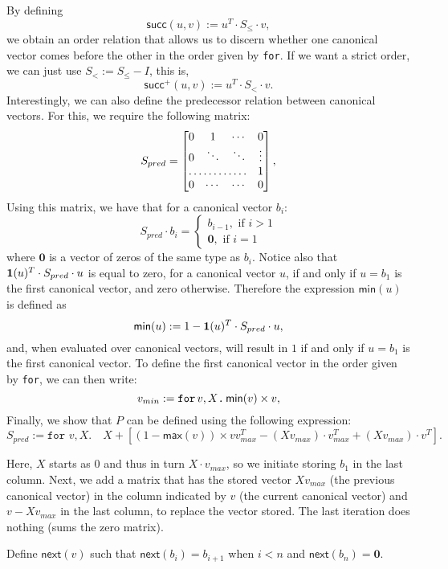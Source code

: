 By defining $$\mathsf{succ}(u,v) := u^T\cdot S_{\leq} \cdot v,$$
we obtain an order relation that allows us to discern whether one canonical vector comes before the other in the order given by \texttt{for}. If we want a strict order, we can just use $S_< := S_{\leq} - I$, this is, $$\mathsf{succ}^+(u,v) := u^T\cdot S_{<} \cdot v.$$
Interestingly, we can also define the predecessor relation between canonical vectors. For this, we require the following matrix:
\[
S_{pred} = \begin{bmatrix}
    0 & 1 & \cdots &  0 \\
    0 & \ddots & \ddots & \vdots \\
    \hdotsfor{3} & 1 \\
    0 & \cdots & \cdots & 0
\end{bmatrix},
\]
Using this matrix, we have that for a canonical vector $b_i$:
\[
S_{pred}\cdot b_i=\begin{cases}
               b_{i-1}, \text{ if } i > 1 \\
              \mathbf{0}, \text{ if } i = 1
            \end{cases}
\]
where $\mathbf{0}$ is a vector of zeros of the same type as $b_i$. Notice also that $\mathbf{1}(u)^T\cdot S_{pred} \cdot u$ is equal to zero, for a canonical vector $u$, if and only if $u = b_1$ is the first canonical vector, and zero otherwise.
Therefore the expression $\mathsf{min}(u)$ is defined as $$\mathsf{min}(u) := 1 - \mathbf{1}(u)^T\cdot S_{pred} \cdot u,$$ and, when evaluated over canonical vectors, will result in $1$ if and only if $u=b_1$ is the first canonical vector.
To define the first canonical vector in the order given by \texttt{for}, we can then write:
$$v_{min} := \texttt{for}\, v,X \texttt{.}\, \mathsf{min}(v)\times v,$$
Finally, we show that $P$ can be defined using the following \langfor expression:
$$S_{pred}:= \texttt{for }v,X.\quad X + \left[ (1 - \mathsf{max}(v))\times vv_{max}^T - (Xv_{max})\cdot v_{max}^T + (Xv_{max})\cdot v^T\right].$$

Here, $X$ starts as 0 and thus in turn $X\cdot v_{max}$, so we initiate storing $b_1$ in the last column. Next, we add a matrix that has the stored vector $Xv_{max}$ (the previous canonical vector) in the column indicated by $v$ (the current canonical vector) and $v-Xv_{max}$ in the last column, to replace the vector stored.
The last iteration does nothing (sums the zero matrix).

Define $\mathsf{next}(v)$ such that $\mathsf{next}(b_i)=b_{i+1}$ when $i<n$ and $\mathsf{next}(b_n)=\mathbf{0}$.